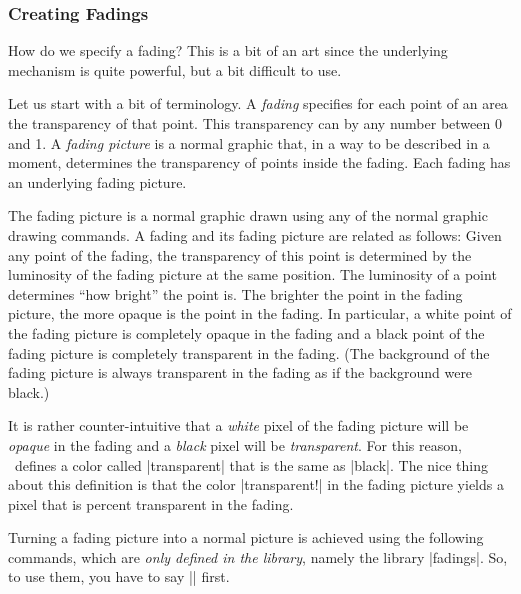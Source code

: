 \subsubsection{Creating Fadings}

How do we specify a fading? This is a bit of an art since the underlying
mechanism is quite powerful, but a bit difficult to use.

Let us start with a bit of terminology. A \emph{fading} specifies for each
point of an area the transparency of that point. This transparency can by any
number between 0 and 1. A \emph{fading picture} is a normal graphic that, in a
way to be described in a moment, determines the transparency of points inside
the fading. Each fading has an underlying fading picture.

The fading picture is a normal graphic drawn using any of the normal graphic
drawing commands. A fading and its fading picture are related as follows: Given
any point of the fading, the transparency of this point is determined by the
luminosity of the fading picture at the same position. The luminosity of a
point determines ``how bright'' the point is. The brighter the point in the
fading picture, the more opaque is the point in the fading. In particular, a
white point of the fading picture is completely opaque in the fading and a
black point of the fading picture is completely transparent in the fading. (The
background of the fading picture is always transparent in the fading as if the
background were black.)

It is rather counter-intuitive that a \emph{white} pixel of the fading picture
will be \emph{opaque} in the fading and a \emph{black} pixel will be
\emph{transparent}. For this reason, \tikzname\ defines a color called
|transparent| that is the same as |black|. The nice thing about this definition
is that the color |transparent!| in the fading picture yields
a pixel that is  percent transparent in the fading.

Turning a fading picture into a normal picture is achieved using the following
commands, which are \emph{only defined in the library}, namely the library
|fadings|. So, to use them, you have to say |\usetikzlibrary{fadings}| first.

